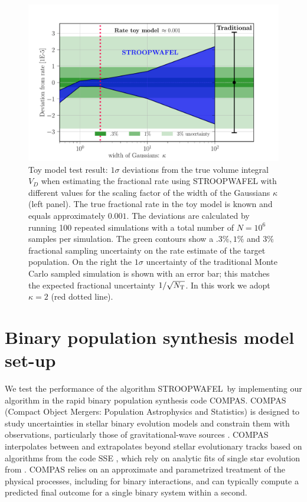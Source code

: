 \documentclass[a4paper,fleqn,usenatbib,useAMS,usedcolumn]{mnras}
\newcommand{\AISs}{\textsc{STROOPWAFEL}}
\begin{document}
\begin{figure}
	\includegraphics[width=1.1\columnwidth]{toymodel_m0_AbsoluteError.pdf}
	    \caption{Toy model test result: $1 \sigma$ deviations from the true volume integral $V_D$ when estimating the fractional rate using \AISs{} with different values for the scaling factor of the width of the Gaussians $\kappa$ (left panel).  The true fractional rate in the toy model is known and equals approximately $ 0.001$. The deviations are calculated by running 100 repeated simulations  with a total number  of $N = 10^6$ samples per simulation. 
The green contours show a $.3\%, 1\%$ and $3\%$ fractional sampling uncertainty on the rate estimate of the target population.   On the right the $1 \sigma$ uncertainty of the traditional Monte Carlo sampled simulation is shown with an error bar; this matches the expected fractional uncertainty $1/\sqrt{N_{\rm{T}}}$.  In this work we adopt $\kappa =2$ (red dotted line).} 
    \label{fig:toymodelAbsError}
\end{figure}
%


\section{Binary population synthesis model set-up}
\label{app:COMPASdetails}

We test the performance of the algorithm \AISs \ by implementing our algorithm in the rapid binary population synthesis code \textsc{COMPAS}. 
\textsc{COMPAS} (Compact Object Mergers: Population Astrophysics and Statistics) is designed to study uncertainties in stellar binary evolution models and constrain them with observations, particularly those of gravitational-wave sources \citep{stevenson2017formation, 2018MNRAS.477.4685B, 2018MNRAS.481.4009V}.  
COMPAS interpolates between and extrapolates beyond stellar evolutionary tracks based on algorithms from the code SSE \citep{2000MNRAS.315..543H}, which rely on analytic fits of single star evolution from \citet{1998IAUS..191P.607P}. COMPAS relies on an approximate and parametrized treatment of the physical processes, including for binary interactions, and can typically compute a predicted final outcome for a single binary system within a second.  
\end{document}

